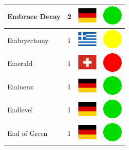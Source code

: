 \documentclass[12pt, a4paper, twoside]{report}
\begin{document}
\begin{center}
\begin{longtable}{|p{5cm}|p{2cm}|p{2cm}|p{2cm}|}
			Embrace Decay & 2 & \includegraphics[width=1cm]{4x3/de} & \includegraphics[width=1cm]{likes/y} \\ \hline
			Embryectomy & 1 & \includegraphics[width=1cm]{4x3/gr} & \includegraphics[width=1cm]{likes/m} \\ \hline
			Emerald & 1 & \includegraphics[width=1cm]{4x3/ch} & \includegraphics[width=1cm]{likes/n} \\ \hline
			Eminenz & 1 & \includegraphics[width=1cm]{4x3/de} & \includegraphics[width=1cm]{likes/y} \\ \hline
			Endlevel & 1 & \includegraphics[width=1cm]{4x3/de} & \includegraphics[width=1cm]{likes/y} \\ \hline
			End of Green & 1 & \includegraphics[width=1cm]{4x3/de} & \includegraphics[width=1cm]{likes/y} \\ \hline

\end{longtable}
\end{center}
\end{document}
